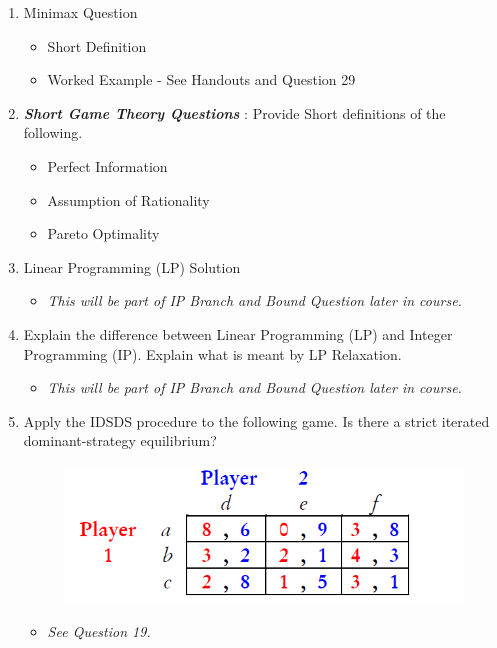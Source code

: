 \documentclass[]{report}
\begin{document}
\begin{enumerate}
 


\item Minimax Question 
\begin{itemize}
	
	\item Short Definition
	\item Worked Example - See Handouts and Question 29
\end{itemize}
\item \textbf{\textit{Short Game Theory Questions}} : Provide Short definitions of the following.
\begin{itemize}
	
	\item Perfect Information
	\item Assumption of Rationality
	\item Pareto Optimality
\end{itemize}
\item Linear Programming (LP) Solution
\begin{itemize}
	
	\item \textit{This will be part of IP Branch and Bound Question later in course.}

\end{itemize}
\item Explain the difference between Linear Programming (LP) and Integer Programming (IP). Explain what is meant by LP Relaxation.
\begin{itemize}
	
	\item \textit{This will be part of IP Branch and Bound Question later in course.}
	
\end{itemize}

\item Apply the IDSDS procedure to the following game. Is there a strict
iterated dominant-strategy equilibrium? \begin{figure}[h!]
\centering
\includegraphics[width=0.55\linewidth]{Question26}
\end{figure}
\begin{itemize}
	\item \textit{See Question 19.}
\end{itemize}


\end{enumerate}
\end{document}
